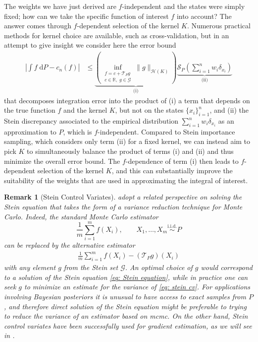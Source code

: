 \documentclass[12pt,paper=letter]{scrreprt}
\newtheorem{remark}{Remark}[chapter]
\begin{document}
The weights we have just derived are $f$-independent and the states were simply fixed; how can we take the specific function of interest $f$ into account?
The answer comes through $f$-dependent selection of the kernel $K$.
Numerous practical methods for kernel choice are available, such as cross-validation, but in an attempt to give insight we consider here the error bound
\begin{align*}
    \left| \int f \; \mathrm{d}P - c_n(f) \right| & \leq \underbrace{ \left( \inf_{\substack{f = c + \mathcal{T}_P g \\ c \in \mathbb{R}, \; g \in \mathcal{G}}} \|g\|_{\mathcal{H}(K)} \right) }_{\text{(i)}} \underbrace{ \mathcal{S}_P\left( \sum_{i=1}^n w_i \delta_{x_i} \right) }_{\text{(ii)}}
\end{align*}
that decomposes integration error into the product of (i) a term that depends on the true function $f$ and the kernel $K$, but not on the states $\{x_i\}_{i=1}^n$, and (ii) the Stein discrepancy associated to the empirical distribution $\sum_{i=1}^n w_i \delta_{x_i}$ as an approximation to $P$, which is $f$-independent.
Compared to Stein importance sampling, which considers only term (ii) for a fixed kernel, we can instead aim to pick $K$ to simultaneously balance the product of terms (i) and (ii) and thus minimize the overall error bound.
The $f$-dependence of term (i) then leads to $f$-dependent selection of the kernel $K$, and this can substantially improve the suitability of the weights that are used in approximating the integral of interest.


\begin{remark}[Stein Control Variates]
\label{rem: cvs}
    \citet{stein2004use} adopt a related perspective on solving the Stein equation that takes the form of a variance reduction technique for Monte Carlo.
    Indeed, the standard Monte Carlo estimator
    $$
        \frac{1}{m} \sum_{i=1}^m f(X_i), \qquad X_1,\dots,X_m \stackrel{\text{i.i.d.}}{\sim} P
    $$
    can be replaced by the alternative estimator
    \begin{align}
        \frac{1}{m} \sum_{i=1}^m f(X_i) - (\mathcal{T}_P g)(X_i) \label{eq: stein cv}
    \end{align}
    with any element $g$ from the Stein set $\mathcal{G}$.
    An optimal \citep[or \emph{zero variance}, as termed by][]{assaraf2003zero,mira2013zero} choice of $g$ would correspond to a solution of the Stein equation \eqref{eq: Stein equation}, while in practice one can seek $g$ to minimize an estimate for the variance of \eqref{eq: stein cv}.
    For applications involving Bayesian posteriors it is unusual to have access to exact samples from $P$, and therefore direct solution of the Stein equation might be preferable to trying to reduce the variance of an estimator based on \ac{mcmc}.
    On the other hand, Stein control variates have been successfully used for gradient estimation, as we will see in .
\end{remark}
\end{document}
